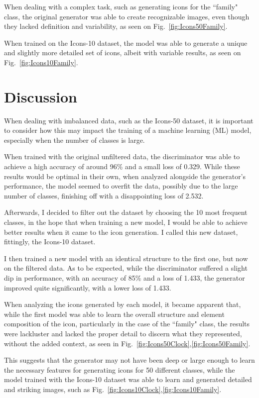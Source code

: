 \documentclass[conference]{IEEEtran}
\begin{document}
When dealing with a complex task, such as generating icons for the ``family" class, the original generator was able to create recognizable images, even though they lacked definition and variability, as seen on Fig.~\ref{fig:Icons50Family}. 

When trained on the Icons-10 dataset, the model was able to generate a unique and slightly more detailed set of icons, albeit with variable results, as seen on Fig.~\ref{fig:Icons10Family}.

\section{Discussion}

When dealing with imbalanced data, such as the Icons-50 dataset, it is important to consider how this may impact the training of a machine learning (ML) model, especially when the number of classes is large.

When trained with the original unfiltered data, the discriminator was able to achieve a high accuracy of around 96\% and a small loss of 0.329. While these results would be optimal in their own, when analyzed alongside the generator's performance, the model seemed to overfit the data, possibly due to the large number of classes, finishing off with a disappointing loss of 2.532.

Afterwards, I decided to filter out the dataset by choosing the 10 most frequent classes, in the hope that when training a new model, I would be able to achieve better results when it came to the icon generation. I called this new dataset, fittingly, the Icons-10 dataset.

I then trained a new model with an identical structure to the first one, but now on the filtered data. As to be expected, while the discriminator suffered a slight dip in performance, with an accuracy of 85\% and a loss of 1.433, the generator improved quite significantly, with a lower loss of 1.433.

When analyzing the icons generated by each model, it became apparent that, while the first model was able to learn the overall structure and element composition of the icon, particularly in the case of the ``family" class, the results were lackluster and lacked the proper detail to discern what they represented, without the added context, as seen in Fig.~\ref{fig:Icons50Clock},\ref{fig:Icons50Family}.

This suggests that the generator may not have been deep or large enough to learn the necessary features for generating icons for 50 different classes, while the model trained with the Icons-10 dataset was able to learn and generated detailed and striking images, such as Fig.~\ref{fig:Icons10Clock},\ref{fig:Icons10Family}.
\end{document}
